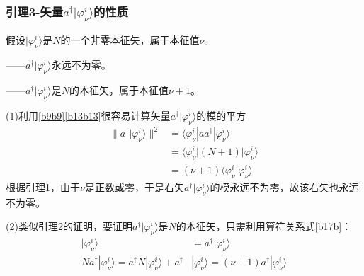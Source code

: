 \documentclass[]{article}
\begin{document}
\subsubsection{引理3-矢量$a^\dagger|\varphi_\nu^i\rangle$的性质}
假设$|\varphi_\nu^i\rangle$是$N$的一个非零本征矢，属于本征值$\nu$。\par 
——$a^\dagger|\varphi_\nu^i\rangle$永远不为零。\par 
——$a^\dagger|\varphi_\nu^i\rangle$是$N$的本征矢，属于本征值$\nu+1$。\par 
(1)利用\eqref{b9b9}\eqref{b13b13}很容易计算矢量$a^\dagger|\varphi_\nu^i\rangle$的模的平方
\begin{align}
	\|a^\dagger|\varphi_\nu^i\rangle\|^2&=\langle\varphi_\nu^i|aa^\dagger|\varphi_\nu^i\rangle\nonumber\\
	&=\langle\varphi_\nu^i|(N+1)|\varphi_\nu^i\rangle\nonumber\\
	&=(\nu+1)\langle\varphi_\nu^i|\varphi_\nu^i\rangle
\end{align}
根据引理1，由于$\nu$是正数或零，于是右矢$a^\dagger|\varphi_\nu^i\rangle$的模永远不为零，故该右矢也永远不为零。\par 
(2)类似引理2的证明，要证明$a^\dagger|\varphi_\nu^i\rangle$是$N$的本征矢，只需利用算符关系式\eqref{b17b}：
\begin{align}
	[N,a^\dagger]|\varphi_\nu^i\rangle&=a^\dagger|\varphi_\nu^i\rangle\nonumber\\
	Na^\dagger|\varphi_\nu^i\rangle=a^\dagger N|\varphi_\nu^i\rangle+a^\dagger&|\varphi_\nu^i\rangle=(\nu+1)a^\dagger|\varphi_\nu^i\rangle
\end{align}
\end{document}
